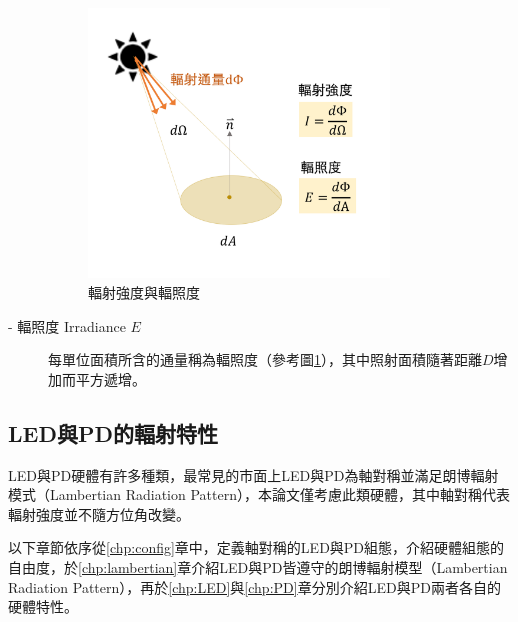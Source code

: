 \begin{description}
                \begin{figure}[ht]
                    \centering
                    \includegraphics[width=8cm]{ch2pic/intensity_irradiance.png}
                    \caption{輻射強度與輻照度}
                    \label{pic:intensity_irradiance}
                \end{figure}

            \item[- 輻照度 Irradiance $E$] \hfill
                
                \qquad
                每單位面積所含的通量稱為輻照度（參考圖\ref{pic:intensity_irradiance}），其中照射面積隨著距離$D$增加而平方遞增。

                
             
        \end{description}

        

        

    \subsection{LED與PD的輻射特性}
    \label{chp:LEDPD_radiate}

    LED與PD硬體有許多種類，最常見的市面上LED與PD為軸對稱並滿足朗博輻射模式（Lambertian Radiation Pattern），本論文僅考慮此類硬體，其中軸對稱代表輻射強度並不隨方位角改變。

    以下章節依序從\ref{chp:config}章中，定義軸對稱的LED與PD組態，介紹硬體組態的自由度，於\ref{chp:lambertian}章介紹LED與PD皆遵守的朗博輻射模型（Lambertian Radiation Pattern），再於\ref{chp:LED}與\ref{chp:PD}章分別介紹LED與PD兩者各自的硬體特性。
        
